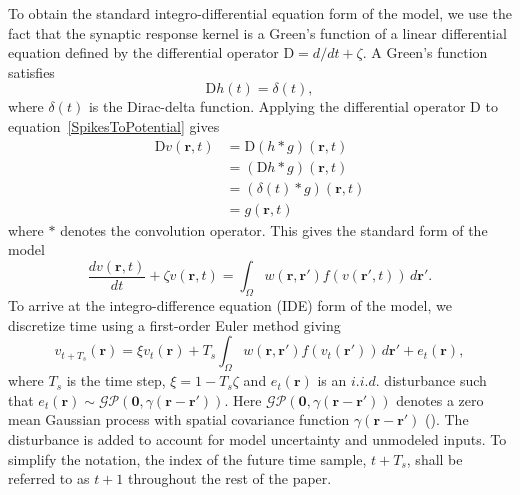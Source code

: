 \documentclass[conference]{IEEEtran}
\begin{document}
To obtain the standard integro-differential equation form of the model, we use the fact that the synaptic response kernel is a Green's function of a linear differential equation defined by the differential operator $\textrm{D}=d/dt + \zeta$. A Green's function satisfies
\begin{equation}
	\label{GreensFuncDef} \textrm{D}h\left( t \right) = \delta \left( t \right), 
\end{equation} 
where $\delta(t)$ is the Dirac-delta function. Applying the differential operator $\textrm{D}$ to equation~\ref{SpikesToPotential} gives
\begin{align}
 \textrm{D}v\left(\mathbf r,t\right)&= \textrm{D}\left(h\ast g\right)\left(\mathbf r,t\right)\\
&=\left(\textrm{D}h\ast g\right)\left(\mathbf r,t\right)\\
&=\left(\delta \left(t\right)\ast g\right)\left(\mathbf r,t\right)\\
&=g\left(\mathbf r,t\right)
\end{align}
where $\ast$ denotes the convolution operator. This gives the standard form of the model
\begin{equation}
	\label{FinalFormContinuous} 
	\frac{dv\left( \mathbf{r},t \right)}{dt} + \zeta v\left( \mathbf{r},t \right) = \int_\Omega {w\left( \mathbf{r},\mathbf{r}' \right)f\left( {v\left( \mathbf{r}',t \right)} \right)\, d\mathbf{r}'}. 
\end{equation}
To arrive at the integro-difference equation (IDE) form of the model, we discretize time using a first-order Euler method giving 
\begin{equation}
	\label{eq:DiscreteTimeModel} 
	v_{t+T_s}\left(\mathbf{r}\right) = 
	\xi v_t\left(\mathbf{r}\right) + 
	T_s \int_\Omega { 
	    w\left(\mathbf{r},\mathbf{r}'\right)
	    f\left(v_t\left(\mathbf{r}'\right)\right) 
	\, d\mathbf{r}'} 
	+ e_t\left(\mathbf{r}\right), 
\end{equation}
where $T_s$ is the time step, $\xi = 1-T_s\zeta $ and $e_t(\mathbf{r})$ is an $i.i.d.$ disturbance such that $e_t(\mathbf{r})\sim\mathcal{GP}(\mathbf 0,\gamma(\mathbf{r}-\mathbf{r}'))$. Here $\mathcal{GP}(\mathbf 0,\gamma(\mathbf{r}-\mathbf{r}'))$ denotes a zero mean Gaussian process with spatial covariance function $\gamma(\mathbf{r}-\mathbf{r}')$ (\cite{Rasmussen2005}). The disturbance is added to account for model uncertainty and unmodeled inputs. To simplify the notation, the index of the future time sample, $t+T_s$, shall be referred to as $t+1$ throughout the rest of the paper. 
\end{document}
